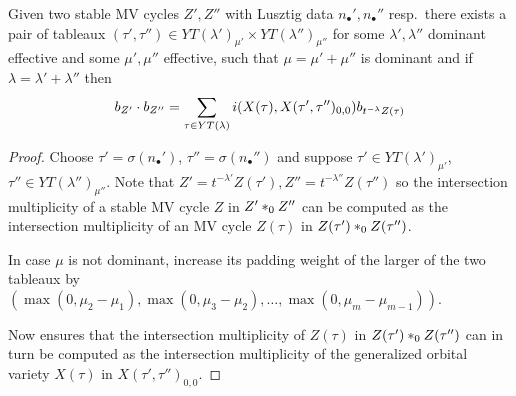 \documentclass[draft]{article} %
\begin{document}
\begin{corollary}
Given two stable MV cycles $Z',Z''$ with Lusztig data $n_\bullet',n_\bullet''$ resp.\ there exists a pair of tableaux $(\tau',\tau'')\in YT(\lambda')_{\mu'}\times YT(\lambda'')_{\mu''}$ for some $\lambda',\lambda''$ dominant effective and some $\mu',\mu''$ effective, such that $\mu = \mu' + \mu''$ is dominant and if $\lambda = \lambda' + \lambda''$ then 
\begin{equation}
    \label{eq:multingovs}
    b_{Z'} \cdot b_{Z''} = \sum_{\tau\in YT(\lambda)} i (X(\tau), X(\tau',\tau'')_{0,0})b_{t^{-\lambda}Z(\tau)}
\end{equation}
% 
\end{corollary}
\begin{proof}
Choose $\tau' = \sigma(n_\bullet')$, $\tau'' = \sigma(n_\bullet'')$ and suppose $\tau'\in YT(\lambda')_{\mu'}$, $\tau'' \in YT(\lambda'')_{\mu''}$. 
Note that $Z'= t^{-\lambda'}Z(\tau'), Z'' = t^{-\lambda''} Z(\tau'')$ so the intersection multiplicity of a stable MV cycle $Z$ in $Z'\ast_{0} Z''$ can be computed as the intersection multiplicity of an MV cycle $Z(\tau)$ in $Z(\tau')\ast_{0} Z(\tau'')$.

In case $\mu$ is not dominant, increase its padding weight of the larger of the two tableaux by $(\max(0,\mu_2-\mu_1),\max(0,\mu_3 - \mu_2),\dots,\max(0,\mu_m-\mu_{m-1}))$. 

Now  ensures that the intersection multiplicity of $Z(\tau)$ in $Z(\tau')\ast_{0} Z(\tau'')$ can in turn be computed as the intersection multiplicity of the generalized orbital variety $X(\tau)$ in $X(\tau',\tau'')_{0,0}$.
\end{proof}

% 
\end{document}
